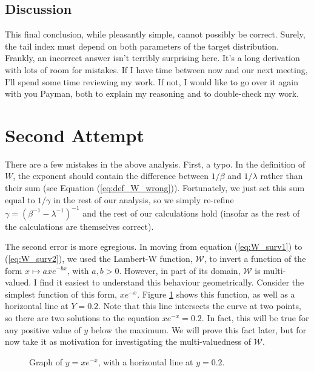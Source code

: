 \documentclass{article}
\newcommand{\sW}{\mathscr{W}}
\begin{document}
\subsection{Discussion}

This final conclusion, while pleasantly simple, cannot possibly be correct. Surely, the tail index must depend on both parameters of the target distribution. Frankly, an incorrect answer isn't terribly surprising here. It's a long derivation with lots of room for mistakes. If I have time between now and our next meeting, I'll spend some time reviewing my work. If not, I would like to go over it again with you Payman, both to explain my reasoning and to double-check my work.


\section{Second Attempt}

There are a few mistakes in the above analysis. First, a typo. In the definition of $W$, the exponent should contain the difference between $1/\beta$ and $1/\lambda$ rather than their sum (see Equation (\ref{eq:def_W_wrong})). Fortunately, we just set this sum equal to $1/\gamma$ in the rest of our analysis, so we simply re-refine $\gamma = (\beta^{-1} - \lambda^{-1})^{-1}$ and the rest of our calculations hold (insofar as the rest of the calculations are themselves correct).

The second error is more egregious. In moving from equation (\ref{eq:W_surv1}) to (\ref{eq:W_surv2}), we used the Lambert-W function, $\sW$, to invert a function of the form $x \mapsto ax e^{-bx}$, with $a,b>0$. However, in part of its domain, $\sW$ is multi-valued. I find it easiest to understand this behaviour geometrically. Consider the simplest function of this form, $x e^{-x}$. Figure \ref{fig:x_ex} shows this function, as well as a horizontal line at $Y=0.2$. Note that this line intersects the curve at two points, so there are two solutions to the equation $x e^{-x} = 0.2$. In fact, this will be true for any positive value of $y$ below the maximum. We will prove this fact later, but for now take it as motivation for investigating the multi-valuedness of $\sW$.

\begin{figure}
    \centering
    \caption{Graph of $y = x e^{-x}$, with a horizontal line at $y=0.2$.}
    \label{fig:x_ex}
\end{figure}
\end{document}
